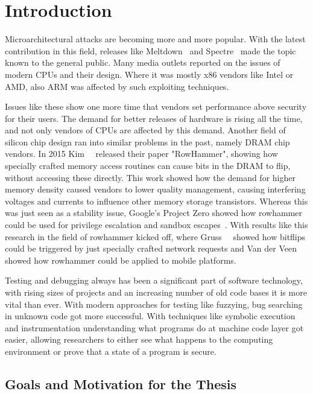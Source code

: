 \chapter{Introduction}\label{sec:intro}

Microarchitectural attacks are becoming more and more popular. With the latest
contribution in this field, releases like Meltdown~\cite{meltdown} and
Spectre~\cite{spectre} made the topic known to the general public. Many media
outlets reported on the issues of modern CPUs and their design. Where it was
mostly x86 vendors like Intel or AMD, also ARM was affected by such exploiting
techniques.

Issues like these show one more time that vendors set performance above security
for their users. The demand for better releases of hardware is rising all the
time, and not only vendors of CPUs are affected by this demand. Another field of
silicon chip design ran into similar problems in the past, namely DRAM chip
vendors. In 2015 Kim~\etal~\cite{rowhammergeneral} released their paper
"RowHammer", showing how specially crafted memory access routines can cause bits
in the DRAM to flip, without accessing these directly. This work showed how the
demand for higher memory density caused vendors to lower quality management,
causing interfering voltages and currents to influence other memory storage
transistors. Whereas this was just seen as a stability issue, Google's Project
Zero showed how rowhammer could be used for privilege escalation and sandbox
escapes~\cite{projectzerorow}. With results like this research in the field of
rowhammer kicked off, where Gruss~\etal~\cite{nethammer} showed how bitflips
could be triggered by just specially crafted network requests and Van der
Veen~\etal~\cite{drammer} showed how rowhammer could be applied to mobile
platforms.

Testing and debugging always has been a significant part of software technology,
with rising sizes of projects and an increasing number of old code bases it is
more vital than ever. With modern approaches for testing like fuzzying, bug
searching in unknown code got more successful. With techniques like symbolic
execution and instrumentation understanding what programs do at machine code
layer got easier, allowing researchers to either see what happens to the
computing environment or prove that a state of a program is secure.

\section{Goals and Motivation for the Thesis}


